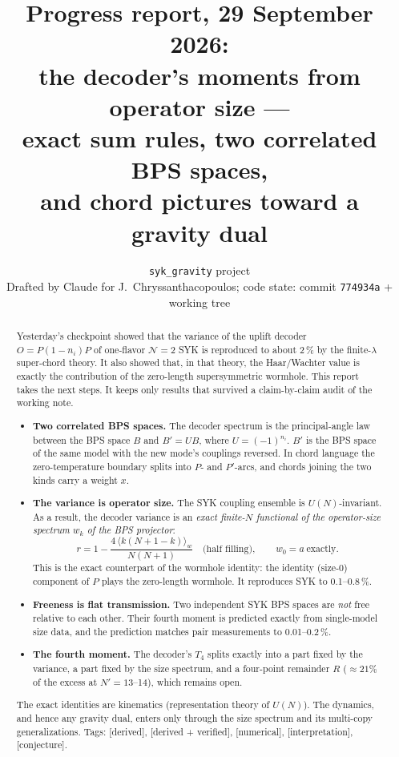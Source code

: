 \documentclass[11pt]{article}
\title{\bf Progress report, 29 September 2026:\\ the decoder's moments from operator size ---\\
exact sum rules, two correlated BPS spaces,\\ and chord pictures toward a gravity dual}
\author{\texttt{syk\_gravity} project\\[2pt]\small Drafted by Claude for J.~Chryssanthacopoulos; code state: commit \texttt{774934a} + working tree}
\date{}
\newcommand{\tagbox}[2]{\textsf{\small\color{#1}[#2]}}
\newcommand{\DER}{\tagbox{cder}{derived}}
\newcommand{\VER}{\tagbox{cder}{derived + verified}}
\newcommand{\NUM}{\tagbox{cnum}{numerical}}
\newcommand{\CONJ}{\tagbox{cconj}{conjecture}}
\newcommand{\INTERP}{\tagbox{cconj}{interpretation}}
\theoremstyle{remark}
\begin{document}
\maketitle

\begin{abstract}
\noindent
Yesterday's checkpoint showed that the variance of the uplift decoder $O=P(1-n_i)P$ of one-flavor $\mathcal N{=}2$
SYK is reproduced to about 2\,\% by the finite-$\lambda$ super-chord theory. It also showed that, in that theory, the
Haar/Wachter value is exactly the contribution of the zero-length supersymmetric wormhole. This report takes the
next steps. It keeps only results that survived a claim-by-claim audit of the working note.

\begin{itemize}\itemsep1pt
\item \textbf{Two correlated BPS spaces.} The decoder spectrum is the principal-angle law between the BPS space $B$
  and $B'=UB$, where $U=(-1)^{n_i}$. $B'$ is the BPS space of the same model with the new mode's couplings reversed.
  In chord language the zero-temperature boundary splits into $P$- and $P'$-arcs, and chords joining the two
  kinds carry a weight $x$.
\item \textbf{The variance is operator size.} The SYK coupling ensemble is $U(N)$-invariant. As a result, the
  decoder variance is an \emph{exact finite-$N$ functional of the operator-size spectrum $w_k$ of the BPS
  projector}:
  \[
  r=1-\frac{4\,\langle k(N+1-k)\rangle_w}{N(N+1)}\quad\text{(half filling)},\qquad w_0=a\ \text{exactly}.
  \]
  This is the exact counterpart of the wormhole identity: the identity (size-0) component of $P$ plays the
  zero-length wormhole. It reproduces SYK to 0.1--0.8\,\%.
\item \textbf{Freeness is flat transmission.} Two independent SYK BPS spaces are \emph{not} free relative to each
  other. Their fourth moment is predicted exactly from single-model size data, and the prediction matches pair
  measurements to 0.01--0.2\,\%.
\item \textbf{The fourth moment.} The decoder's $T_4$ splits exactly into a part fixed by the variance, a part fixed
  by the size spectrum, and a four-point remainder $R$ ($\approx21\%$ of the excess at $N'=13$--14), which remains
  open.
\end{itemize}
The exact identities are kinematics (representation theory of $U(N)$). The dynamics, and hence any gravity dual,
enters only through the size spectrum and its multi-copy generalizations. Tags: \DER, \VER, \NUM, \INTERP, \CONJ.
\end{abstract}
\end{document}
